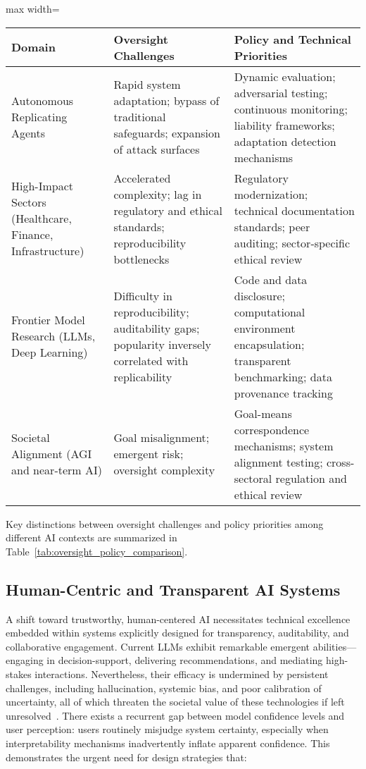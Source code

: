 \begin{table*}[htbp]
\centering
\caption{Comparison of Oversight Challenges and Policy Priorities in AI Deployment}
\label{tab:oversight_policy_comparison}
\begin{adjustbox}{max width=\textwidth}
\begin{tabular}{lll}
\toprule
\textbf{Domain} & \textbf{Oversight Challenges} & \textbf{Policy and Technical Priorities} \\
\midrule
Autonomous Replicating Agents & Rapid system adaptation; bypass of traditional safeguards; expansion of attack surfaces & Dynamic evaluation; adversarial testing; continuous monitoring; liability frameworks; adaptation detection mechanisms \\
High-Impact Sectors (Healthcare, Finance, Infrastructure) & Accelerated complexity; lag in regulatory and ethical standards; reproducibility bottlenecks & Regulatory modernization; technical documentation standards; peer auditing; sector-specific ethical review \\
Frontier Model Research (LLMs, Deep Learning) & Difficulty in reproducibility; auditability gaps; popularity inversely correlated with replicability & Code and data disclosure; computational environment encapsulation; transparent benchmarking; data provenance tracking \\
Societal Alignment (AGI and near-term AI) & Goal misalignment; emergent risk; oversight complexity & Goal-means correspondence mechanisms; system alignment testing; cross-sectoral regulation and ethical review  \\
\bottomrule
\end{tabular}
\end{adjustbox}
\end{table*}

Key distinctions between oversight challenges and policy priorities among different AI contexts are summarized in Table~\ref{tab:oversight_policy_comparison}.

\subsection{Human-Centric and Transparent AI Systems}

A shift toward trustworthy, human-centered AI necessitates technical excellence embedded within systems explicitly designed for transparency, auditability, and collaborative engagement. Current LLMs exhibit remarkable emergent abilities—engaging in decision-support, delivering recommendations, and mediating high-stakes interactions. Nevertheless, their efficacy is undermined by persistent challenges, including hallucination, systemic bias, and poor calibration of uncertainty, all of which threaten the societal value of these technologies if left unresolved~\cite{ref35,ref39,ref42,ref46}. There exists a recurrent gap between model confidence levels and user perception: users routinely misjudge system certainty, especially when interpretability mechanisms inadvertently inflate apparent confidence. This demonstrates the urgent need for design strategies that:

